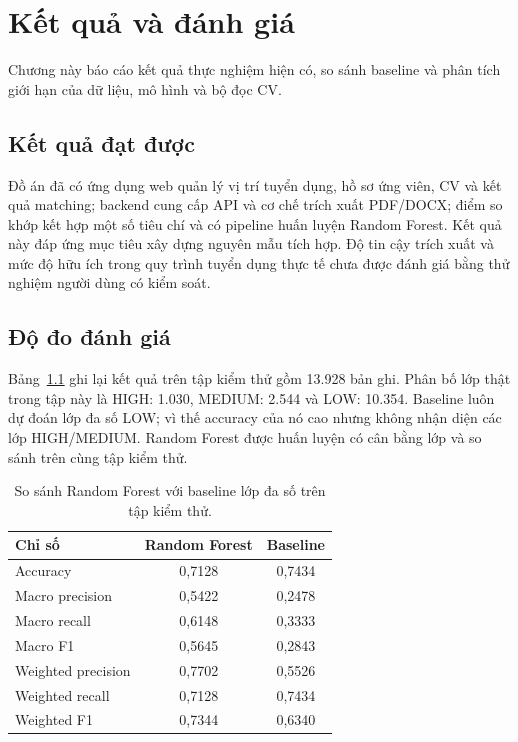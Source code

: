 \chapter{Kết quả và đánh giá}
\label{ch:ketqua}

\begin{muctieu}
Chương này báo cáo kết quả thực nghiệm hiện có, so sánh baseline và phân tích giới hạn của dữ liệu, mô hình và bộ đọc CV.
\end{muctieu}

\section{Kết quả đạt được}
Đồ án đã có ứng dụng web quản lý vị trí tuyển dụng, hồ sơ ứng viên, CV và kết quả matching; backend cung cấp API và cơ chế trích xuất PDF/DOCX; điểm so khớp kết hợp một số tiêu chí và có pipeline huấn luyện Random Forest. Kết quả này đáp ứng mục tiêu xây dựng nguyên mẫu tích hợp. Độ tin cậy trích xuất và mức độ hữu ích trong quy trình tuyển dụng thực tế chưa được đánh giá bằng thử nghiệm người dùng có kiểm soát.

\section{Độ đo đánh giá}
Bảng~\ref{tab:ketqua} ghi lại kết quả trên tập kiểm thử gồm 13.928 bản ghi. Phân bố lớp thật trong tập này là HIGH: 1.030, MEDIUM: 2.544 và LOW: 10.354. Baseline luôn dự đoán lớp đa số LOW; vì thế accuracy của nó cao nhưng không nhận diện các lớp HIGH/MEDIUM. Random Forest được huấn luyện có cân bằng lớp và so sánh trên cùng tập kiểm thử.

\begin{table}[H]
\centering
\caption{So sánh Random Forest với baseline lớp đa số trên tập kiểm thử.}
\label{tab:ketqua}
\begin{tabular}{lcc}
\toprule
\textbf{Chỉ số} & \textbf{Random Forest} & \textbf{Baseline} \\
\midrule
Accuracy & 0,7128 & 0,7434 \\
Macro precision & 0,5422 & 0,2478 \\
Macro recall & 0,6148 & 0,3333 \\
Macro F1 & 0,5645 & 0,2843 \\
Weighted precision & 0,7702 & 0,5526 \\
Weighted recall & 0,7128 & 0,7434 \\
Weighted F1 & 0,7344 & 0,6340 \\
\bottomrule
\end{tabular}
\end{table}

